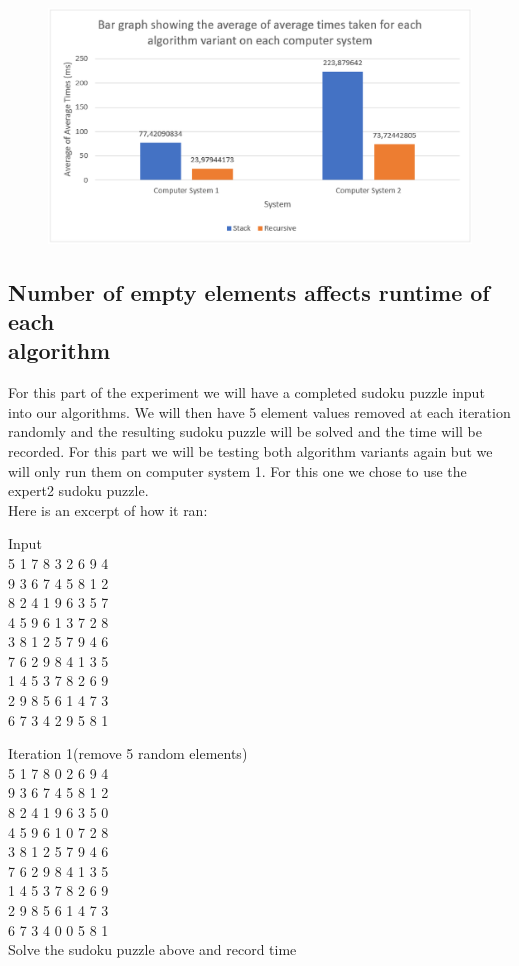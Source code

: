 \documentclass[11pt]{article}
\begin{document}
\begin{figure}[H]
\centering
\includegraphics[scale=0.54]{fig9.eps}
\caption{ }
\end{figure}


\subsection{Number of empty elements affects runtime of each \\algorithm}
For this part of the experiment we will have a completed sudoku puzzle input into our algorithms. 
We will then have 5 element values removed at each iteration randomly and the resulting sudoku puzzle will be solved and the time will be recorded. 
For this part we will be testing both algorithm variants again but we will only run them on computer system 1. 
For this one we chose to use the expert2 sudoku puzzle. 
\\Here is an excerpt of how it ran:

\vspace{3mm} %

Input
\\5 1 7 8 3 2 6 9 4 
\\9 3 6 7 4 5 8 1 2 
\\8 2 4 1 9 6 3 5 7 
\\4 5 9 6 1 3 7 2 8 
\\3 8 1 2 5 7 9 4 6 
\\7 6 2 9 8 4 1 3 5 
\\1 4 5 3 7 8 2 6 9 
\\2 9 8 5 6 1 4 7 3 
\\6 7 3 4 2 9 5 8 1

\vspace{3mm} %

Iteration 1(remove 5 random elements)
\\5 1 7 8 0 2 6 9 4 
\\9 3 6 7 4 5 8 1 2 
\\8 2 4 1 9 6 3 5 0 
\\4 5 9 6 1 0 7 2 8 
\\3 8 1 2 5 7 9 4 6 
\\7 6 2 9 8 4 1 3 5 
\\1 4 5 3 7 8 2 6 9 
\\2 9 8 5 6 1 4 7 3 
\\6 7 3 4 0 0 5 8 1
\\Solve the sudoku puzzle above and record time
\end{document}
